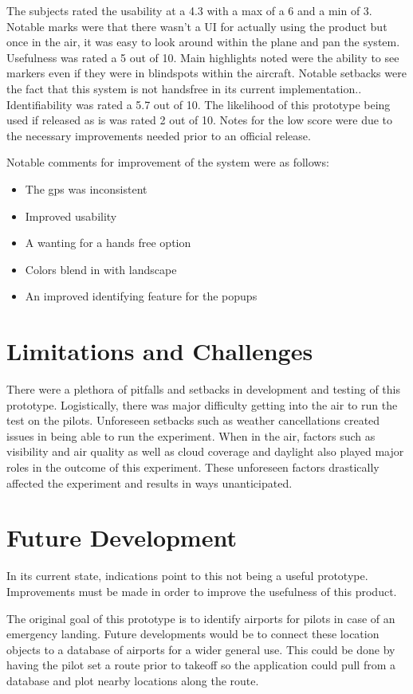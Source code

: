 \documentclass[journal]{vgtc}                %
\begin{document}
The subjects rated the usability at a 4.3 with a max of a 6 and a min of 3. Notable marks were that there wasn’t a UI for actually using the product but once in the air, it was easy to look around within the plane and pan the system. Usefulness was rated a 5 out of 10. Main highlights noted were the ability to see markers even if they were in blindspots within the aircraft. Notable setbacks were the fact that this system is not handsfree in its current implementation.. Identifiability was rated a 5.7 out of 10. The likelihood of this prototype being used if released as is was rated 2 out of 10. Notes for the low score were due to the necessary improvements needed prior to an official release.

Notable comments for improvement of the system were as follows:
\begin{itemize}
  \item The gps was inconsistent
  \item Improved usability
  \item A wanting for a hands free option
  \item Colors blend in with landscape
  \item An improved identifying feature for the popups
\end{itemize}

\section{Limitations and Challenges}
There were a plethora of pitfalls and setbacks in development and testing of this prototype. Logistically, there was major difficulty getting into the air to run the test on the pilots. Unforeseen setbacks such as weather cancellations created issues in being able to run the experiment. When in the air, factors such as visibility and air quality as well as cloud coverage and daylight also played major roles in the outcome of this experiment. These unforeseen factors drastically affected the experiment and results in ways unanticipated. 

\section{Future Development}
In its current state, indications point to this not being a useful prototype. Improvements must be made in order to improve the usefulness of this product.

The original goal of this prototype is to identify airports for pilots in case of an emergency landing. Future developments would be to connect these location objects to a database of airports for a wider general use. This could be done by having the pilot set a route prior to takeoff so the application could pull from a database and plot nearby locations along the route. 
\end{document}
